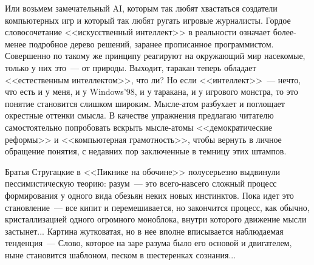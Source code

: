 \documentclass{scrbook}
\newcommand{\flqq}{<<}
\newcommand{\frqq}{>>}
\newcommand{\mdash}{~--- }
\begin{document}
Или возьмем замечательный AI, которым так любят хвастаться создатели компьютерных игр и который так любят ругать игровые журналисты. Гордое словосочетание {\flqq}искусственный интеллект{\frqq} в реальности означает более-менее подробное дерево решений, заранее прописанное программистом. Совершенно по такому же принципу реагируют на окружающий мир насекомые, только у них это{\mdash}от природы. Выходит, таракан теперь обладает {\flqq}естественным интеллектом{\frqq}, что ли? Но если {\flqq}интеллект{\frqq}{\mdash}нечто, что есть и у меня, и у Windows'98, и у таракана, и у игрового монстра, то это понятие становится слишком широким. Мысле-атом разбухает и поглощает окрестные оттенки смысла.
В качестве упражнения предлагаю читателю самостоятельно попробовать вскрыть мысле-атомы {\flqq}демократические реформы{\frqq} и {\flqq}компьютерная грамотность{\frqq}, чтобы вернуть в личное обращение понятия, с недавних пор заключенные в темницу этих штампов.

Братья Стругацкие в {\flqq}Пикнике на обочине{\frqq} полусерьезно выдвинули пессимистическую теорию: разум{\mdash}это всего-навсего сложный процесс формирования у одного вида обезьян неких новых инстинктов. Пока идет это становление{\mdash}все кипит и перемешивается, но закончится процесс, как обычно, кристаллизацией одного огромного моноблока, внутри которого движение мысли застынет... Картина жутковатая, но в нее вполне вписывается наблюдаемая тенденция{\mdash}Слово, которое на заре разума было его основой и двигателем, ныне становится шаблоном, песком в шестеренках сознания...
\end{document}
